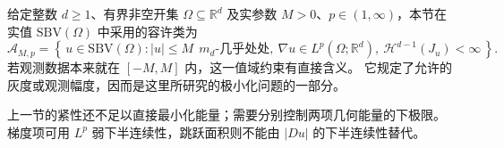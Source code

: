 \ProseParagraphBreak

给定整数 \(d\ge1\)、有界非空开集 \(\Omega\subseteq\mathbb R^d\) 及实参数 \(M>0\)、\(p\in(1,\infty)\)，本节在实值 \(\mathrm{SBV}(\Omega)\) 中采用的容许类为
\begin{equation}\label{b1:eq:mumford-shah-admissible-class}
 \mathcal A_{M,p}=
 \left\{\,u\in \mathrm{SBV}(\Omega):
 |u|\le M\ \ m_d\text{-几乎处处},\
 \nabla u\in L^p(\Omega;\mathbb R^d),\
 \mathcal H^{d-1}(J_u)<\infty\,\right\}.
\end{equation}
若观测数据本来就在 \([-M,M]\) 内，这一值域约束有直接含义。
它规定了允许的灰度或观测幅度，因而是这里所研究的极小化问题的一部分。

\ProseParagraphBreak

上一节的紧性还不足以直接最小化能量；需要分别控制两项几何能量的下极限。
梯度项可用 \(L^p\) 弱下半连续性，跳跃面积则不能由 \(|Du|\) 的下半连续性替代。


